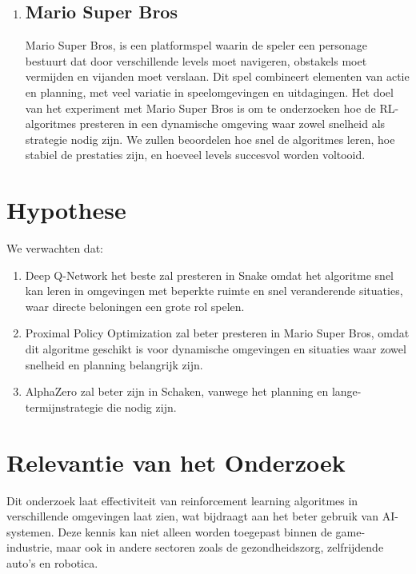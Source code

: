 \documentclass[a4paper,12pt]{article}
\begin{document}
\begin{enumerate}
    \item\subsection*{Mario Super Bros}
          Mario Super Bros, is een platformspel waarin de speler een personage bestuurt
          dat door verschillende levels moet navigeren, obstakels moet vermijden en
          vijanden moet verslaan. Dit spel combineert elementen van actie en planning,
          met veel variatie in speelomgevingen en uitdagingen. Het doel van het
          experiment met Mario Super Bros is om te onderzoeken hoe de RL-algoritmes
          presteren in een dynamische omgeving waar zowel snelheid als strategie nodig
          zijn. We zullen beoordelen hoe snel de algoritmes leren, hoe stabiel de
          prestaties zijn, en hoeveel levels succesvol worden voltooid.
\end{enumerate}

\section{Hypothese}
We verwachten dat:
\begin{enumerate}
    \item Deep Q-Network het beste zal presteren in Snake omdat het algoritme snel kan
          leren in omgevingen met beperkte ruimte en snel veranderende situaties, waar
          directe beloningen een grote rol spelen.

    \item Proximal Policy Optimization zal beter presteren in Mario Super Bros, omdat dit
          algoritme geschikt is voor dynamische omgevingen en situaties waar zowel
          snelheid en planning belangrijk zijn.

    \item AlphaZero zal beter zijn in Schaken, vanwege het planning en
          lange-termijnstrategie die nodig zijn.

\end{enumerate}

\section{Relevantie van het Onderzoek}
Dit onderzoek laat effectiviteit van reinforcement learning algoritmes in
verschillende omgevingen laat zien, wat bijdraagt aan het beter gebruik van
AI-systemen. Deze kennis kan niet alleen worden toegepast binnen de
game-industrie, maar ook in andere sectoren zoals de gezondheidszorg,
zelfrijdende auto's en robotica.
\end{document}
